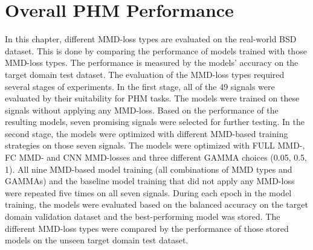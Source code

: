 \section{Overall PHM Performance}\label{ch:PHM_performance}
In this chapter, different MMD-loss types are evaluated on the real-world BSD dataset. This is done by comparing the performance of models trained with those MMD-loss types. The performance is measured by the models' accuracy on the target domain test dataset. The evaluation of the MMD-loss types required several stages of experiments.
In the first stage, all of the 49 signals were evaluated by their suitability for PHM tasks. The models were trained on these signals without applying any MMD-loss. Based on the performance of the resulting models, seven promising signals were selected for further testing. In the second stage, the models were optimized with different MMD-based training strategies on those seven signals. The models were optimized with FULL MMD-, FC MMD- and CNN MMD-losses and three different GAMMA choices (0.05, 0.5, 1). All nine MMD-based model training (all combinations of MMD types and GAMMAs) and the baseline model training that did not apply any MMD-loss were repeated five times on all seven signals. During each epoch in the model training, the models were evaluated based on the balanced accuracy on the target domain validation dataset and the best-performing model was stored. The different MMD-loss types were compared by the performance of those stored models on the unseen target domain test dataset.



